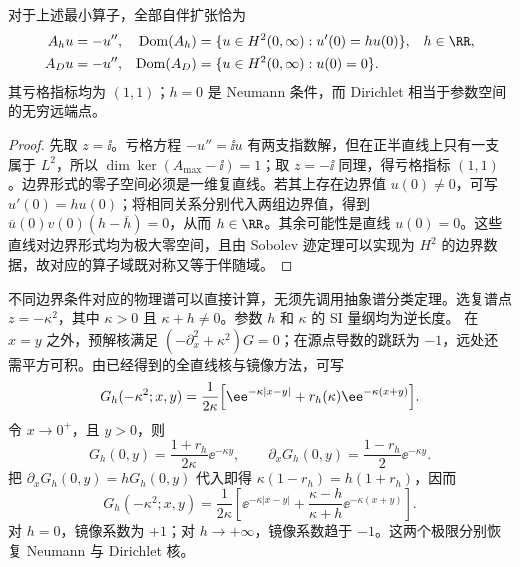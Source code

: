 \begin{theorem}\label{thm:ghs-r7-robin-domains}
对于上述最小算子，全部自伴扩张恰为
\begin{equation}\label{eq:ghs-r7-robin-domain}
 \begin{aligned}
 A_hu&=-u'',&\operatorname{Dom}(A_h)
 &=\{u\in H^2(0,\infty):u'(0)=hu(0)\},&&h\in\RR,\\
 A_Du&=-u'',&\operatorname{Dom}(A_D)
 &=\{u\in H^2(0,\infty):u(0)=0\}.
 \end{aligned}
\end{equation}
其亏格指标均为 $(1,1)$；$h=0$ 是 Neumann 条件，而 Dirichlet 相当于参数空间的无穷远端点。
\end{theorem}
\begin{proof}
先取 $z=\ii$。亏格方程 $-u''=\ii u$ 有两支指数解，但在正半直线上只有一支属于 $L^2$，所以 $\dim\ker(A_{\max}-\ii)=1$；取 $z=-\ii$ 同理，得亏格指标 $(1,1)$。边界形式的零子空间必须是一维复直线。若其上存在边界值 $u(0)\neq0$，可写 $u'(0)=hu(0)$；将相同关系分别代入两组边界值，得到 $\overline u(0)v(0)(h-\overline h)=0$，从而 $h\in\RR$。其余可能性是直线 $u(0)=0$。这些直线对边界形式均为极大零空间，且由 Sobolev 迹定理可以实现为 $H^2$ 的边界数据，故对应的算子域既对称又等于伴随域。
\end{proof}

不同边界条件对应的物理谱可以直接计算，无须先调用抽象谱分类定理。选复谱点 $z=-\kappa^2$，其中 $\kappa>0$ 且 $\kappa+h\neq0$。参数 $h$ 和 $\kappa$ 的 SI 量纲均为逆长度。 在 $x=y$ 之外，预解核满足 $(-\partial_x^2+\kappa^2)G=0$；在源点导数的跳跃为 $-1$，远处还需平方可积。由已经得到的全直线核与镜像方法，可写
\[
 G_h(-\kappa^2;x,y)=\frac{1}{2\kappa}\Bigl[
 \ee^{-\kappa|x-y|}+r_h(\kappa)\ee^{-\kappa(x+y)}\Bigr].
\]
令 $x\to0^+$，且 $y>0$，则
\[
 G_h(0,y)=\frac{1+r_h}{2\kappa}\ee^{-\kappa y},\qquad
 \partial_xG_h(0,y)=\frac{1-r_h}{2}\ee^{-\kappa y}.
\]
把 $\partial_xG_h(0,y)=hG_h(0,y)$ 代入即得 $\kappa(1-r_h)=h(1+r_h)$，因而
\begin{equation}\label{eq:ghs-r7-robin-resolvent}
 G_h(-\kappa^2;x,y)=\frac{1}{2\kappa}\left[
 \ee^{-\kappa|x-y|}+\frac{\kappa-h}{\kappa+h}\ee^{-\kappa(x+y)}\right].
\end{equation}
对 $h=0$，镜像系数为 $+1$；对 $h\to+\infty$，镜像系数趋于 $-1$。这两个极限分别恢复 Neumann 与 Dirichlet 核。

